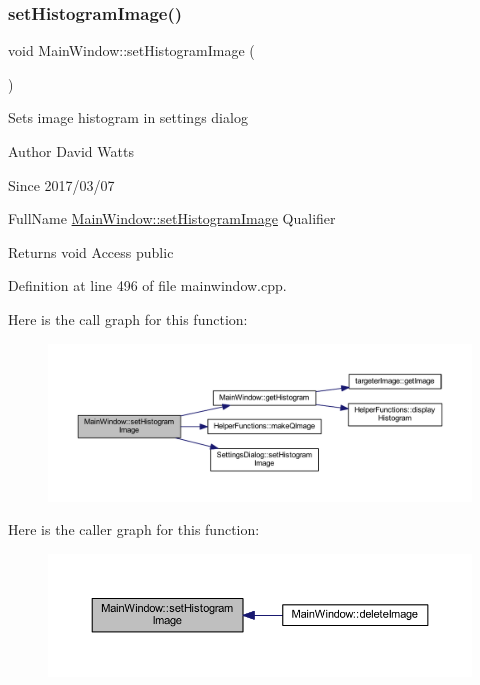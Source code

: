 \subsubsection{\texorpdfstring{set\+Histogram\+Image()}{setHistogramImage()}}
{\footnotesize\ttfamily void Main\+Window\+::set\+Histogram\+Image (\begin{DoxyParamCaption}{ }\end{DoxyParamCaption})}

Sets image histogram in settings dialog

\begin{DoxyAuthor}{Author}
David Watts 
\end{DoxyAuthor}
\begin{DoxySince}{Since}
2017/03/07
\end{DoxySince}
Full\+Name \hyperlink{class_main_window_a5e130e8122dbab96f931a7ecc41086d3}{Main\+Window\+::set\+Histogram\+Image} Qualifier \begin{DoxyReturn}{Returns}
void Access public 
\end{DoxyReturn}


Definition at line 496 of file mainwindow.\+cpp.

Here is the call graph for this function\+:
\nopagebreak
\begin{figure}[H]
\begin{center}
\leavevmode
\includegraphics[width=350pt]{class_main_window_a5e130e8122dbab96f931a7ecc41086d3_cgraph}
\end{center}
\end{figure}
Here is the caller graph for this function\+:
\nopagebreak
\begin{figure}[H]
\begin{center}
\leavevmode
\includegraphics[width=350pt]{class_main_window_a5e130e8122dbab96f931a7ecc41086d3_icgraph}
\end{center}
\end{figure}
\mbox{\label{class_main_window_a280d25148ac076ca817d411372584ae5}} 
